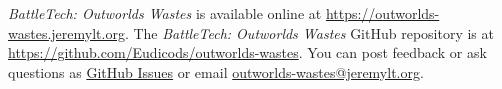 \emph{BattleTech: Outworlds Wastes} is available online at \href{https://outworlds-wastes.jeremylt.org}{https://outworlds-wastes.jeremylt.org}.
The \emph{BattleTech: Outworlds Wastes} GitHub repository is at \href{https://github.com/Eudicods/outworlds-wastes}{https://github.com/Eudicods/outworlds-wastes}.
You can post feedback or ask questions as \href{https://github.com/Eudicods/outworlds-wastes/issues}{GitHub Issues} or email \href{mailto:outworlds-wastes@jeremylt.org}{outworlds-wastes@jeremylt.org}.
